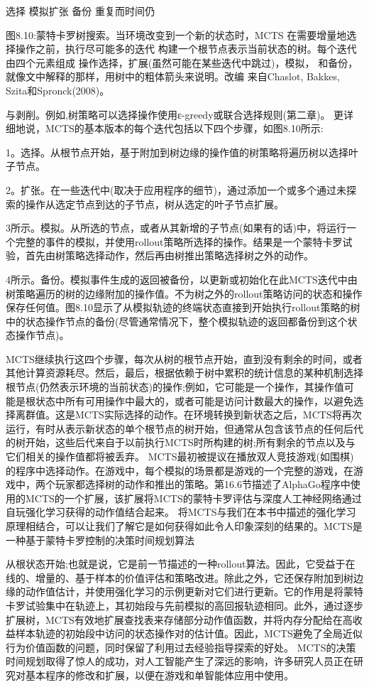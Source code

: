 选择 					模拟扩张 					备份
重复而时间仍
 

图8.10:蒙特卡罗树搜索。当环境改变到一个新的状态时，MCTS
在需要增量地选择操作之前，执行尽可能多的迭代
构建一个根节点表示当前状态的树。每个迭代由四个元素组成
操作选择，扩展(虽然可能在某些迭代中跳过)，模拟，
和备份，就像文中解释的那样，用树中的粗体箭头来说明。改编
来自Chaslot, Bakkes, Szita和Spronck(2008)。

与剥削。例如,树策略可以选择操作使用ε-greedy或联合选择规则(第二章)。
更详细地说，MCTS的基本版本的每个迭代包括以下四个步骤，如图8.10所示:

1。选择。从根节点开始，基于附加到树边缘的操作值的树策略将遍历树以选择叶子节点。

2。扩张。在一些迭代中(取决于应用程序的细节)，通过添加一个或多个通过未探索的操作从选定节点到达的子节点，树从选定的叶子节点扩展。

3所示。模拟。从所选的节点，或者从其新增的子节点(如果有的话)中，将运行一个完整的事件的模拟，并使用rollout策略所选择的操作。结果是一个蒙特卡罗试验，首先由树策略选择动作，然后再由树推出策略选择树之外的动作。

4所示。备份。模拟事件生成的返回被备份，以更新或初始化在此MCTS迭代中由树策略遍历的树的边缘附加的操作值。不为树之外的rollout策略访问的状态和操作保存任何值。图8.10显示了从模拟轨迹的终端状态直接到开始执行rollout策略的树中的状态操作节点的备份(尽管通常情况下，整个模拟轨迹的返回都备份到这个状态操作节点)。

MCTS继续执行这四个步骤，每次从树的根节点开始，直到没有剩余的时间，或者其他计算资源耗尽。然后，最后，根据依赖于树中累积的统计信息的某种机制选择根节点(仍然表示环境的当前状态)的操作;例如，它可能是一个操作，其操作值可能是根状态中所有可用操作中最大的，或者可能是访问计数最大的操作，以避免选择离群值。这是MCTS实际选择的动作。在环境转换到新状态之后，MCTS将再次运行，有时从表示新状态的单个根节点的树开始，但通常从包含该节点的任何后代的树开始，这些后代来自于以前执行MCTS时所构建的树;所有剩余的节点以及与它们相关的操作值都将被丢弃。
MCTS最初被提议在播放双人竞技游戏(如围棋)的程序中选择动作。在游戏中，每个模拟的场景都是游戏的一个完整的游戏，在游戏中，两个玩家都选择树的动作和推出的策略。第16.6节描述了AlphaGo程序中使用的MCTS的一个扩展，该扩展将MCTS的蒙特卡罗评估与深度人工神经网络通过自玩强化学习获得的动作值结合起来。
将MCTS与我们在本书中描述的强化学习原理相结合，可以让我们了解它是如何获得如此令人印象深刻的结果的。MCTS是一种基于蒙特卡罗控制的决策时间规划算法


从根状态开始;也就是说，它是前一节描述的一种rollout算法。因此，它受益于在线的、增量的、基于样本的价值评估和策略改进。除此之外，它还保存附加到树边缘的动作值估计，并使用强化学习的示例更新对它们进行更新。它的作用是将蒙特卡罗试验集中在轨迹上，其初始段与先前模拟的高回报轨迹相同。此外，通过逐步扩展树，MCTS有效地扩展查找表来存储部分动作值函数，并将内存分配给在高收益样本轨迹的初始段中访问的状态操作对的估计值。因此，MCTS避免了全局近似行为价值函数的问题，同时保留了利用过去经验指导探索的好处。
MCTS的决策时间规划取得了惊人的成功，对人工智能产生了深远的影响，许多研究人员正在研究对基本程序的修改和扩展，以便在游戏和单智能体应用中使用。


